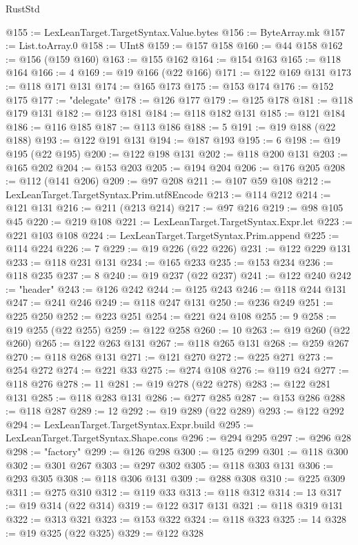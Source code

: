 \begin{lexlean}{RustStd}
\begin{coremodule}
@155 := LexLeanTarget.TargetSyntax.Value.bytes
@156 := ByteArray.mk
@157 := List.toArray.{0}
@158 := UInt8
@159 := @157 @158
@160 := @44 @158
@162 := @156 (@159 @160)
@163 := @155 @162
@164 := @154 @163
@165 := @118 @164
@166 := 4
@169 := @19 @166 (@22 @166)
@171 := @122 @169 @131
@173 := @118 @171 @131
@174 := @165 @173
@175 := @153 @174
@176 := @152 @175
@177 := "delegate"
@178 := @126 @177
@179 := @125 @178
@181 := @118 @179 @131
@182 := @123 @181
@184 := @118 @182 @131
@185 := @121 @184
@186 := @116 @185
@187 := @113 @186
@188 := 5
@191 := @19 @188 (@22 @188)
@193 := @122 @191 @131
@194 := @187 @193
@195 := 6
@198 := @19 @195 (@22 @195)
@200 := @122 @198 @131
@202 := @118 @200 @131
@203 := @165 @202
@204 := @153 @203
@205 := @194 @204
@206 := @176 @205
@208 := @112 (@141 @206)
@209 := @97 @208
@211 := @107 @59 @108
@212 := LexLeanTarget.TargetSyntax.Prim.utf8Encode
@213 := @114 @212
@214 := @121 @131
@216 := @211 (@213 @214)
@217 := @97 @216
@219 := @98 @105 @45
@220 := @219 @108
@221 := LexLeanTarget.TargetSyntax.Expr.let
@223 := @221 @103 @108
@224 := LexLeanTarget.TargetSyntax.Prim.append
@225 := @114 @224
@226 := 7
@229 := @19 @226 (@22 @226)
@231 := @122 @229 @131
@233 := @118 @231 @131
@234 := @165 @233
@235 := @153 @234
@236 := @118 @235
@237 := 8
@240 := @19 @237 (@22 @237)
@241 := @122 @240
@242 := "header"
@243 := @126 @242
@244 := @125 @243
@246 := @118 @244 @131
@247 := @241 @246
@249 := @118 @247 @131
@250 := @236 @249
@251 := @225 @250
@252 := @223 @251
@254 := @221 @24 @108
@255 := 9
@258 := @19 @255 (@22 @255)
@259 := @122 @258
@260 := 10
@263 := @19 @260 (@22 @260)
@265 := @122 @263 @131
@267 := @118 @265 @131
@268 := @259 @267
@270 := @118 @268 @131
@271 := @121 @270
@272 := @225 @271
@273 := @254 @272
@274 := @221 @33
@275 := @274 @108
@276 := @119 @24
@277 := @118 @276
@278 := 11
@281 := @19 @278 (@22 @278)
@283 := @122 @281 @131
@285 := @118 @283 @131
@286 := @277 @285
@287 := @153 @286
@288 := @118 @287
@289 := 12
@292 := @19 @289 (@22 @289)
@293 := @122 @292
@294 := LexLeanTarget.TargetSyntax.Expr.build
@295 := LexLeanTarget.TargetSyntax.Shape.cons
@296 := @294 @295
@297 := @296 @28
@298 := "factory"
@299 := @126 @298
@300 := @125 @299
@301 := @118 @300
@302 := @301 @267
@303 := @297 @302
@305 := @118 @303 @131
@306 := @293 @305
@308 := @118 @306 @131
@309 := @288 @308
@310 := @225 @309
@311 := @275 @310
@312 := @119 @33
@313 := @118 @312
@314 := 13
@317 := @19 @314 (@22 @314)
@319 := @122 @317 @131
@321 := @118 @319 @131
@322 := @313 @321
@323 := @153 @322
@324 := @118 @323
@325 := 14
@328 := @19 @325 (@22 @325)
@329 := @122 @328

\end{coremodule}
\end{lexlean}
